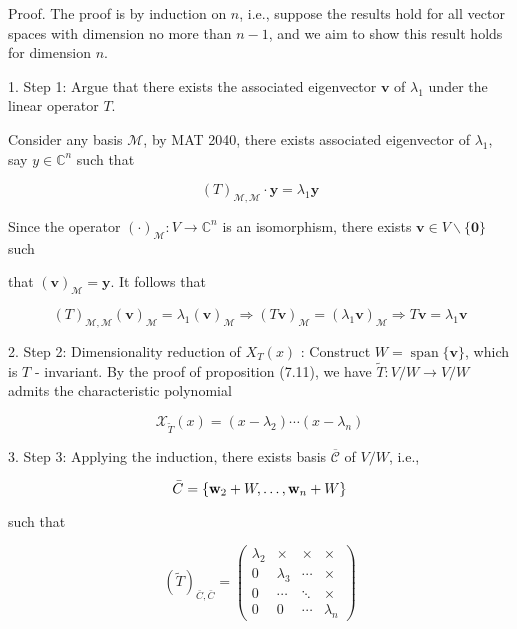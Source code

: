 \documentclass[11pt]{article}
\begin{document}
Proof. The proof is by induction on \(n\), i.e., suppose the results hold for all vector spaces with dimension no more than \(n - 1\), and we aim to show this result holds for dimension \(n\).

1. Step 1: Argue that there exists the associated eigenvector \(\mathbf{v}\) of \({\lambda }_1\) under the linear operator \(T\).

Consider any basis \(\mathcal{M}\), by MAT 2040, there exists associated eigenvector of \({\lambda }_1\), say \(y \in  {\mathbb{C}}^n\) such that

\[
{\left( T\right) }_{\mathcal{M},\mathcal{M}} \cdot  \mathbf{y} = {\lambda }_1\mathbf{y}
\]

Since the operator \({\left( \cdot \right) }_{\mathcal{M}} : V \rightarrow  {\mathbb{C}}^n\) is an isomorphism, there exists \(\mathbf{v} \in  V \smallsetminus  \{ \mathbf{0}\}\) such

that \({\left( \mathbf{v}\right) }_{\mathcal{M}} = \mathbf{y}\). It follows that

\[
{\left( T\right) }_{\mathcal{M},\mathcal{M}}{\left( \mathbf{v}\right) }_{\mathcal{M}} = {\lambda }_1{\left( \mathbf{v}\right) }_{\mathcal{M}} \Rightarrow  {\left( T\mathbf{v}\right) }_{\mathcal{M}} = {\left( {\lambda }_1\mathbf{v}\right) }_{\mathcal{M}} \Rightarrow  T\mathbf{v} = {\lambda }_1\mathbf{v}
\]

2. Step 2: Dimensionality reduction of \({X}_{T}\left( x\right)\) : Construct \(W = \operatorname{span}\{ \mathbf{v}\}\), which is \(T\) - invariant. By the proof of proposition (7.11), we have \(\widetilde{T} : V/W \rightarrow  V/W\) admits the characteristic polynomial

\[
{\mathcal{X}}_{\widetilde{T}}\left( x\right)  = \left( {x - {\lambda }_2}\right) \cdots \left( {x - {\lambda }_n}\right)
\]

3. Step 3: Applying the induction, there exists basis \(\overline{\mathcal{C}}\) of \(V/W\), i.e.,

\[
\bar{C} = \left\{  {{\bf w}_2 + W,\ldots ,{\bf w}_n + W}\right\}
\]

such that

\[
{\left( \widetilde{T}\right) }_{\bar{C},\bar{C}} = \left( \begin{matrix} {\lambda }_2 &  \times  &  \times  &  \times  \\  0 & {\lambda }_{3} & \cdots &  \times  \\  0 & \cdots &  \ddots  &  \times  \\  0 & 0 & \cdots & {\lambda }_n \end{matrix}\right)
\]
\end{document}
